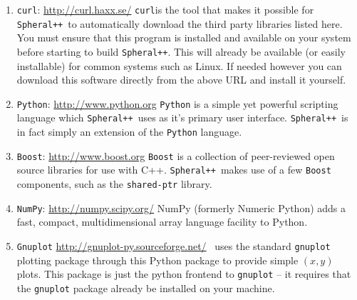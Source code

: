 \documentclass{article}
\newcommand{\Spheral}{{\tt Spheral++}}
\newcommand{\curl}{{\tt curl}}
\begin{document}
\begin{enumerate}
\item \curl: \url{http://curl.haxx.se/}
\curl is the tool that makes it possible for \Spheral\ to automatically download
the third party libraries listed here.  You must ensure that this program is
installed and available on your system before starting to build \Spheral.  This
will already be available (or easily installable) for common systems such as
Linux.  If needed however you can download this software directly from the
above URL and install it yourself.

\item \verb+Python+: \url{http://www.python.org} \label{python.item} \newline
\verb+Python+ is a simple yet powerful scripting language which \Spheral\ uses
as it's primary user interface.  \Spheral\ is in fact simply an extension of the
\verb+Python+ language.

\item \verb+Boost+: \url{http://www.boost.org} \label{boost.item} \newline
\verb+Boost+ is a collection of peer-reviewed open source libraries for use with
C++.  \Spheral\ makes use of a few \verb+Boost+ components, such as the
\verb+shared-ptr+ library.

\item \verb+NumPy+: \url{http://numpy.scipy.org/} \newline
NumPy (formerly Numeric Python) adds a fast, compact, multidimensional array
language facility to Python.

\item \verb+Gnuplot+ \label{gnuplot.item}
  \url{http://gnuplot-py.sourceforge.net/} \newline \Spheral\ uses the standard
  \verb+gnuplot+ plotting package through this Python package to provide simple
  $(x,y)$ plots.  This package is just the python frontend to \verb+gnuplot+ --
  it requires that the \verb+gnuplot+ package already be installed on your
  machine.



\end{enumerate}
\end{document}
